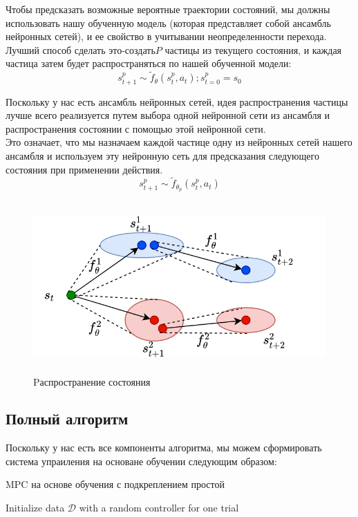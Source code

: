 \documentclass[a4paper,12pt]{article}
\begin{document}
Чтобы предсказать возможные вероятные траектории состояний, мы должны использовать нашу обученную модель (которая представляет собой ансамбль нейронных сетей), и ее свойство в учитывании неопределенности перехода.\\

Лучший способ сделать это-создать$ P $ частицы из текущего состояния, и каждая частица затем будет распространяться по нашей обученной модели:
$$s_{t+1}^p \sim \tilde{f}_\theta (s_t^p, a_t) ; s_{t=0}^p = s_0$$

Поскольку у нас есть ансамбль нейронных сетей, идея распространения частицы лучше всего реализуется путем выбора одной нейронной сети из ансамбля и распространения состоянии с помощью этой нейронной сети. \\

Это означает, что мы назначаем каждой частице одну из нейронных сетей нашего ансамбля и используем эту нейронную сеть для предсказания следующего состояния при применении действия.
$$s_{t+1}^p \sim \tilde{f}_{\theta_p}(s_t^p,a_t)$$

\begin{figure}[H]
    \centering
    \includegraphics[height=6.5cm]{img/state_prob(1).png}
    \caption{Pаспространение состояния}
    \label{fig:my_label}
\end{figure}
\newpage
\subsection{Полный алгоритм}
Поскольку у нас есть все компоненты алгоритма, мы можем сформировать система упраиления на основане обучении следующим образом:
\begin{algorithm}
\SetAlgoLined
\DontPrintSemicolon
\caption{MPC на основе обучения с подкреплением простой}
Initialize data $\mathcal{D}$ with a random controller for one trial\\
\end{algorithm}
\end{document}
